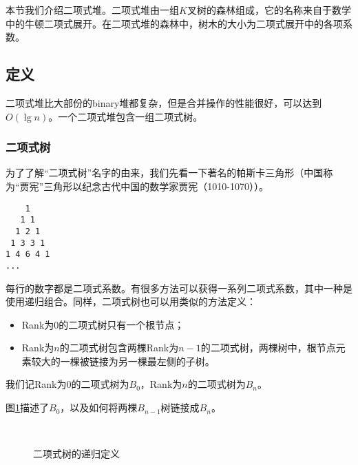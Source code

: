\documentclass[UTF8]{article}
\begin{document}
本节我们介绍二项式堆。二项式堆由一组$K$叉树的森林组成，它的名称来自于数学中的牛顿二项式展开。在二项式堆的森林中，树木的大小为二项式展开中的各项系数。

\subsection{定义}

二项式堆比大部份的binary堆都复杂，但是合并操作的性能很好，可以达到$O(\lg n)$。一个二项式堆包含一组二项式树。

\subsubsection{二项式树}
\label{Binomial tree} 

为了了解“二项式树”名字的由来，我们先看一下著名的帕斯卡三角形（中国称为“贾宪”三角形以纪念古代中国的数学家贾宪（1010-1070））\cite{wiki-pascal-triangle}。

\begin{verbatim}
    1
   1 1
  1 2 1
 1 3 3 1
1 4 6 4 1
...
\end{verbatim}

每行的数字都是二项式系数。有很多方法可以获得一系列二项式系数，其中一种是使用递归组合。同样，二项式树也可以用类似的方法定义：

\begin{itemize}
\item Rank为0的二项式树只有一个根节点；
\item Rank为$n$的二项式树包含两棵Rank为$n-1$的二项式树，两棵树中，根节点元素较大的一棵被链接为另一棵最左侧的子树。
\end{itemize}

我们记Rank为0的二项式树为$B_0$，Rank为$n$的二项式树为$B_n$。

图\ref{fig:link-bitree}描述了$B_0$，以及如何将两棵$B_{n-1}$树链接成$B_n$。

\begin{figure}[htbp]
  \centering
   \\
  \caption{二项式树的递归定义} \label{fig:link-bitree}
\end{figure}
\end{document}
